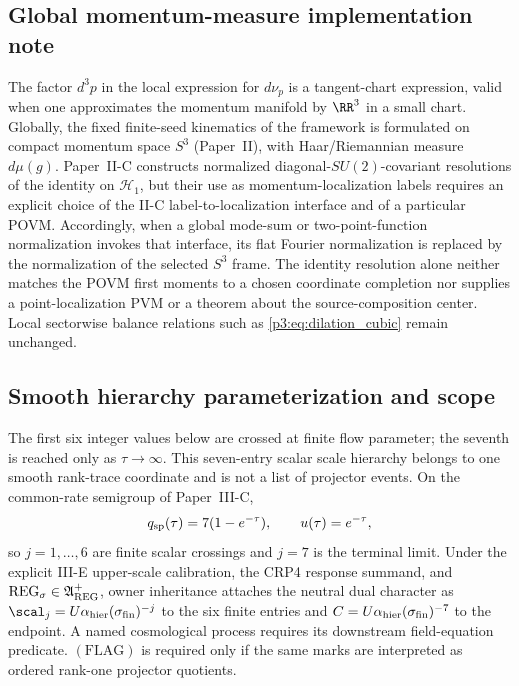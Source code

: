 \documentclass[11pt,a4paper]{article}
\begin{document}
\subsection{Global momentum-measure implementation note}
\label{p3e:app:global-momentum-measure}
\begin{remark}
\label{p3:rem:local-global-measure}
The factor \(d^3p\) in the local expression for \(d\nu_p\) is a tangent-chart
expression, valid when one approximates the momentum manifold by \(\RR^3\)
in a small chart.  Globally, the fixed finite-seed kinematics of the
framework is formulated on compact momentum space \(S^3\) (Paper~II), with
Haar/Riemannian measure \(d\mu(g)\).  Paper~II-C constructs normalized
diagonal-\(SU(2)\)-covariant resolutions of the identity on
\(\mathcal H_1\), but their use as momentum-localization labels requires an
explicit choice of the II-C label-to-localization interface and of a
particular POVM.  Accordingly, when a global mode-sum or two-point-function
normalization invokes that interface, its flat Fourier normalization is
replaced by the normalization of the selected \(S^3\) frame.  The identity
resolution alone neither matches the POVM first moments to a chosen
coordinate completion nor supplies a point-localization PVM or a theorem
about the source-composition center.  Local sectorwise balance relations such
as \eqref{p3:eq:dilation_cubic} remain unchanged.
\end{remark}

\subsection{Smooth hierarchy parameterization and scope}
\label{p3e:app:hierarchy-bookkeeping}
The first six integer values below are crossed at finite flow parameter; the
seventh is reached only as \(\tau\to\infty\).  This seven-entry scalar scale
hierarchy belongs to one smooth rank-trace coordinate and is not a list of
projector events.  On the common-rate semigroup of Paper~III-C,
\[
 q_{\rm sp}(\tau)=7(1-e^{-\tau}),\qquad
 u(\tau)=e^{-\tau},
\]
so \(j=1,\ldots,6\) are finite scalar crossings and \(j=7\) is the terminal
limit.  Under the explicit III-E upper-scale calibration, the CRP4 response
summand, and
\(\mathrm{REG}_{\sigma}\in\mathfrak A_{\rm REG}^{+}\), owner inheritance
attaches the neutral dual character as
\(\scal_j=U\alpha_{\rm hier}(\sigma_{\rm fin})^{-j}\) to the six finite
entries and
\(C=U\alpha_{\rm hier}(\sigma_{\rm fin})^{-7}\) to the endpoint.  A named
cosmological process requires its downstream field-equation predicate.
\((\mathrm{FLAG})\) is required only if the same marks are interpreted as
ordered rank-one projector quotients.
\end{document}
